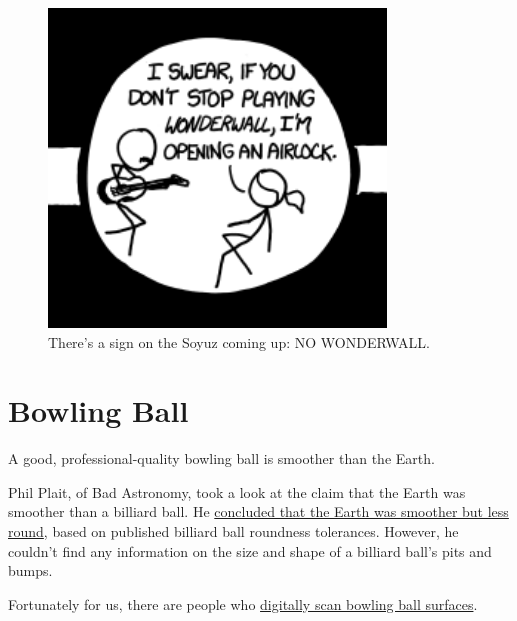 {\begin{figure}[!htbp]
\centering
\includegraphics[scale=0.5, max width=0.8\textwidth]{imgs/a/45/hadfield_wonderwall.png}
\caption{There’s a sign on the Soyuz coming up: NO WONDERWALL.}
\end{figure}

{
\chapter{Bowling Ball}
}

\hfill{}

{A good, professional-quality bowling ball is smoother than the Earth.}

{Phil Plait, of Bad Astronomy, took a look at the claim that the Earth was smoother than a billiard ball. He \href{http://blogs.discovermagazine.com/badastronomy/2008/09/08/ten-things-you-dont-know-about-the-earth/\#.UZrBpmRAC9a}{concluded that the Earth was smoother but less round}, based on published billiard ball roundness tolerances. However, he couldn’t find any information on the size and shape of a billiard ball’s pits and bumps.}

{Fortunately for us, there are people who \href{http://www.youtube.com/watch?v=r5V3rFdAIMY}{digitally scan bowling ball surfaces}.}

}
